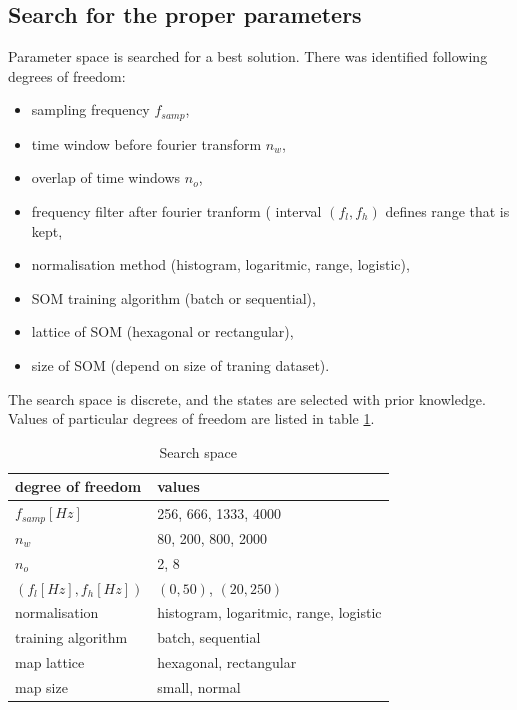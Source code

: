 \documentclass[a4paper,journal]{IEEEtran}
\begin{document}
\subsection{Search for the proper parameters}
Parameter space is searched for a best solution. There was identified
following degrees of freedom:
\begin{itemize}
	\item sampling frequency $ f_{samp} $,
	\item time window before fourier transform $ n_w $,
	\item overlap of time windows $ n_o $,
	\item frequency filter after fourier tranform ( interval $ (f_l, f_h) $ defines 
	range that is kept,
	\item normalisation method (histogram, logaritmic, range, logistic),
	\item SOM training algorithm (batch or sequential),
	\item lattice of SOM (hexagonal or rectangular),
	\item size of SOM (depend on size of traning dataset).
\end{itemize}
The search space is discrete, and the states are selected with prior knowledge.
Values of particular degrees of freedom are listed  in table \ref{searchspace}.


\begin{table}[h]
\caption{Search space}
	\begin{center}
		\begin{tabular}{|l| l |}
			\hline
			degree of freedom & values \\
			\hline
			\hline
			$ f_{samp} [Hz] $ & 256, 666, 1333, 4000\\
			\hline
			$ n_w $ & 80, 200, 800, 2000 \\
			\hline
			$ n_o $ & 2, 8 \\
			\hline
			$ (f_l[Hz], f_h[Hz]) $ & $ (0, 50) $,  $ (20, 250) $  \\
			\hline
			normalisation & histogram, logaritmic, range, logistic \\
			\hline
			training algorithm & batch, sequential  \\
			\hline
			map lattice & hexagonal, rectangular \\
			\hline
			map size  & small, normal \\
			\hline
		\end{tabular}
	\end{center}
\label{searchspace}
\end{table}
\end{document}
